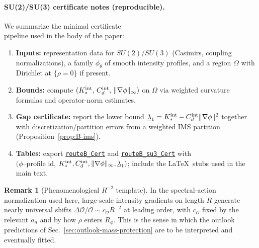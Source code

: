\documentclass[11pt]{article}
\theoremstyle{definition}
\newtheorem{remark}[theorem]{Remark}
\begin{document}
    \paragraph{SU(2)/SU(3) certificate notes (reproducible).}
    We summarize the minimal certificate\\ pipeline used in the body of the paper:
    \begin{enumerate}
    	\item \textbf{Inputs:} representation data for $SU(2)$/$SU(3)$ (Casimirs, coupling normalizations), a family $\phi_\theta$ of smooth intensity profiles, and a region $\Omega$ with Dirichlet at $\{\rho=0\}$ if present.
    	\item \textbf{Bounds:} compute $(K_\ast^{\rm int},\,C_d^{\rm int},\,\|\nabla\phi\|_\infty)$ on $\Omega$ via weighted curvature formulas and operator-norm estimates. 
    	\item \textbf{Gap certificate:} report the lower bound 
    	$\underline{\lambda}_1=K_\ast^{\rm int}-C_d^{\rm int}\|\nabla\phi\|^2$ together with discretization/partition errors from a weighted IMS partition (Proposition~\ref{prop:B-ims}).
    	\item \textbf{Tables:} export \href{https://github.com/KerymMacryn/Route_B_Reproducibility/blob/main/certs/routeB_certificates.csv}{\nolinkurl{routeB_Cert}} and \href{https://github.com/KerymMacryn/Route_B_Reproducibility/blob/main/certs/routeB_su3_certificates.csv}{\nolinkurl{routeB_su3_Cert}} with\\ $(\phi$–profile id, $K_\ast^{\rm int}, C_d^{\rm int}, \|\nabla\phi\|_\infty, \underline{\lambda}_1)$; include the \LaTeX\ stubs used in the main text.
    \end{enumerate}
    
    \begin{remark}[Phenomenological $R^{-2}$ template]
    	In the spectral-action normalization used here, large-scale intensity gradients on length $R$ generate nearly universal shifts 
    	$\Delta \mathcal{O}/\mathcal{O} \sim c_\mathcal{O} R^{-2}$ at leading order, with $c_\mathcal{O}$ fixed by the relevant $a_n$ and by how $\rho$ enters $R_\phi$.
    	This is the sense in which the outlook predictions of Sec.~\ref{sec:outlook-mass-protection} are to be interpreted and eventually fitted.
    \end{remark}
    
\end{document}
